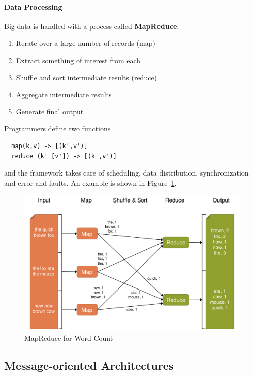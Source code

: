 \paragraph{Data Processing}
Big data is handled with a process called \textbf{MapReduce}:
\begin{enumerate}
  \item Iterate over a large number of records (map)
  \item Extract something of interest from each
  \item Shuffle and sort intermediate results (reduce)
  \item Aggregate intermediate results
  \item Generate final output
\end{enumerate}
Programmers define two functions
\begin{lstlisting}
  map(k,v) -> [(k',v')]
  reduce (k' [v']) -> [(k',v')]
\end{lstlisting}
and the framework takes care of scheduling, data distribution, synchronization and error and faults.
An example is shown in Figure~\ref{fig:map_reduce_example}.
\begin{figure}[h]
  \centering
  \includegraphics[width=.8\textwidth]{images/map_reduce_example.png}
  \caption{MapReduce for Word Count}\label{fig:map_reduce_example}
\end{figure}

\subsection{Message-oriented Architectures}

